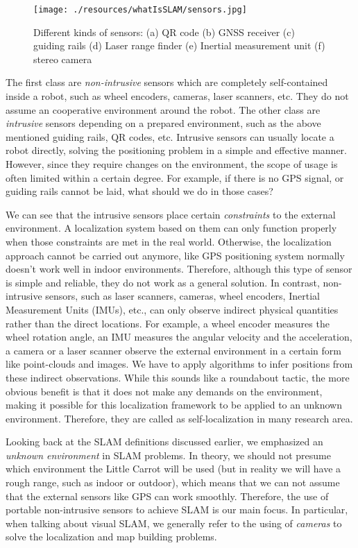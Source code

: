 \begin{figure}
	\centering
	\texttt{[image: ./resources/whatIsSLAM/sensors.jpg]}
	\caption{Different kinds of sensors: (a) QR code (b) GNSS receiver (c) guiding rails (d) Laser range finder (e) Inertial measurement unit (f) stereo camera }
	\label{fig:sensors}
\end{figure}

The first class are \emph{non-intrusive} sensors which are completely self-contained inside a robot, such as wheel encoders, cameras, laser scanners, etc. They do not assume an cooperative environment around the robot. The other class are \emph{intrusive} sensors depending on a prepared environment, such as the above mentioned guiding rails, QR codes, etc. Intrusive sensors can usually locate a robot directly, solving the positioning problem in a simple and effective manner. However, since they require changes on the environment, the scope of usage is often limited within a certain degree. For example, if there is no GPS signal, or guiding rails cannot be laid, what should we do in those cases?

We can see that the intrusive sensors place certain \emph{constraints} to the external environment. A localization system based on them can only function properly when those constraints are met in the real world. Otherwise, the localization approach cannot be carried out anymore, like GPS positioning system normally doesn't work well in indoor environments. Therefore, although this type of sensor is simple and reliable, they do not work as a general solution. In contrast, non-intrusive sensors, such as laser scanners, cameras, wheel encoders, Inertial Measurement Units (IMUs), etc., can only observe indirect physical quantities rather than the direct locations. For example, a wheel encoder measures the wheel rotation angle, an IMU measures the angular velocity and the acceleration, a camera or a laser scanner observe the external environment in a certain form like point-clouds and images. We have to apply algorithms to infer positions from these indirect observations. While this sounds like a roundabout tactic, the more obvious benefit is that it does not make any demands on the environment, making it possible for this localization framework to be applied to an unknown environment. Therefore, they are called as self-localization in many research area.

Looking back at the SLAM definitions discussed earlier, we emphasized an \emph{unknown environment} in SLAM problems. In theory, we should not presume which environment the Little Carrot will be used (but in reality we will have a rough range, such as indoor or outdoor), which means that we can not assume that the external sensors like GPS can work smoothly. Therefore, the use of portable non-intrusive sensors to achieve SLAM is our main focus. In particular, when talking about visual SLAM, we generally refer to the using of \emph{cameras} to solve the localization and map building problems.

